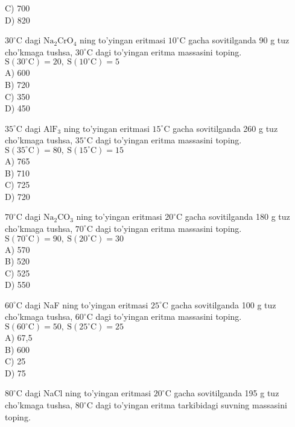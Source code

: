 C) 700\\
D) 820
  \item $30^{\circ} \mathrm{C}$ dagi $\mathrm{Na}_{2} \mathrm{CrO}_{4}$ ning to'yingan eritmasi $10^{\circ} \mathrm{C}$ gacha sovitilganda 90 g tuz cho'kmaga tushsa, $30^{\circ} \mathrm{C}$ dagi to'yingan eritma massasini toping.\\
$\mathrm{S}\left(30^{\circ} \mathrm{C}\right)=20, \mathrm{~S}\left(10^{\circ} \mathrm{C}\right)=5$\\
A) 600\\
B) 720\\
C) 350\\
D) 450
  \item $35^{\circ} \mathrm{C}$ dagi $\mathrm{AlF}_{3}$ ning to'yingan eritmasi $15^{\circ} \mathrm{C}$ gacha sovitilganda 260 g tuz cho'kmaga tushsa, $35^{\circ} \mathrm{C}$ dagi to'yingan eritma massasini toping.\\
$\mathrm{S}\left(35^{\circ} \mathrm{C}\right)=80, \mathrm{~S}\left(15^{\circ} \mathrm{C}\right)=15$\\
A) 765\\
B) 710\\
C) 725\\
D) 720
  \item $70^{\circ} \mathrm{C}$ dagi $\mathrm{Na}_{2} \mathrm{CO}_{3}$ ning to'yingan eritmasi $20^{\circ} \mathrm{C}$ gacha sovitilganda 180 g tuz cho'kmaga tushsa, $70^{\circ} \mathrm{C}$ dagi to'yingan eritma massasini toping.\\
$\mathrm{S}\left(70^{\circ} \mathrm{C}\right)=90, \mathrm{~S}\left(20^{\circ} \mathrm{C}\right)=30$\\
A) 570\\
B) 520\\
C) 525\\
D) 550
  \item $60^{\circ} \mathrm{C}$ dagi NaF ning to'yingan eritmasi $25^{\circ} \mathrm{C}$ gacha sovitilganda 100 g tuz cho'kmaga tushsa, $60^{\circ} \mathrm{C}$ dagi to'yingan eritma massasini toping.\\
$\mathrm{S}\left(60^{\circ} \mathrm{C}\right)=50, \mathrm{~S}\left(25^{\circ} \mathrm{C}\right)=25$\\
A) 67,5\\
B) 600\\
C) 25\\
D) 75
  \item $80^{\circ} \mathrm{C}$ dagi NaCl ning to'yingan eritmasi $20^{\circ} \mathrm{C}$ gacha sovitilganda 195 g tuz cho'kmaga tushsa, $80^{\circ} \mathrm{C}$ dagi to'yingan eritma tarkibidagi suvning massasini toping.\\
